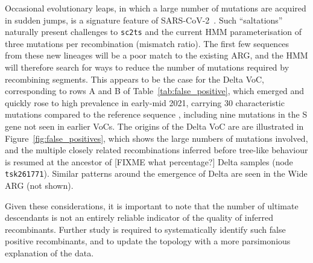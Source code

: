 \documentclass{article}
\begin{document}
Occasional evolutionary leaps, in which a large number of mutations
are acquired in sudden jumps,
is a signature feature of
SARS-CoV-2~\citep{Corey2021-sars,otto2021origins,Nielsen2023-host}.
Such ``saltations'' naturally present challenges to \texttt{sc2ts} and the
current HMM parameterisation of three mutations per recombination (mismatch
ratio). The first few sequences from these new lineages will be a poor match to
the existing ARG, and the HMM will therefore
search for ways to reduce the number of mutations required by recombining
segments.
This appears to be the case for the Delta VoC,
corresponding to rows A and B of Table~\ref{tab:false_positive},
which emerged and quickly rose to high prevalence in early-mid 2021,
carrying 30 characteristic mutations compared to the reference sequence
\citep{McCrone2022-context}, including nine mutations in the S gene
not seen in earlier VoCs.
The origins of the  Delta VoC are
are illustrated in  Figure~\ref{fig:false_positives},
which shows the large numbers of mutations involved,
and the multiple closely related recombinations inferred
before tree-like behaviour is resumed at the ancestor of
[FIXME what percentage?] Delta samples (node \texttt{tsk261771}).
Similar patterns around the emergence of Delta are seen in the Wide ARG
(not shown).

Given these considerations, it  is important to note that the
number of ultimate descendants is not an entirely reliable
indicator of the quality of inferred recombinants.
Further study is required to systematically identify such false
positive recombinants, and to update the topology with a
more parsimonious explanation of the data.
\end{document}
